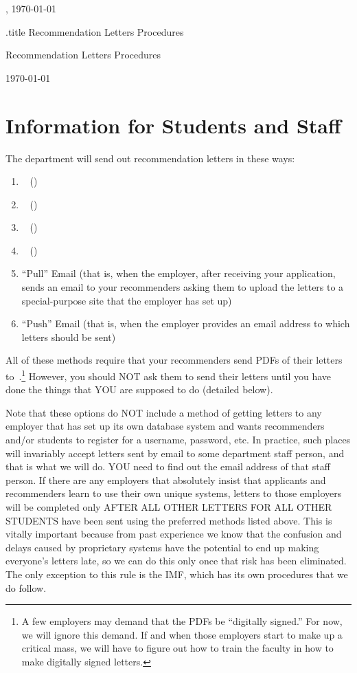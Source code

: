 \documentclass{econtex}
\begin{document}
\hfill{\tiny \jobname, \today}
\vspace{.1in}

\begin{verbatimwrite}{\jobname.title}
Recommendation Letters Procedures
\end{verbatimwrite}
\centerline{\Large Recommendation Letters Procedures}\medskip\medskip

\centerline{\today}\medskip\medskip

\ifdvi\large\fi

\section{Information for Students and Staff}

The department will send out recommendation letters in these ways:
\begin{enumerate}
\item \EJM ~ (\EJMLink)
\item \AJO ~ (\AJOLink)
\item \AEA ~ (\AEALink)
\item \Interfolio ~ (\InterfolioLink)
\item ``Pull'' Email (that is, when the employer, after receiving your application, sends an email to your recommenders asking them to upload the letters to a special-purpose site that the employer has set up)
\item ``Push'' Email (that is, when the employer provides an email address to which letters should be sent)
\end{enumerate}

All of these methods require that your recommenders send PDFs of their letters 
to~\JMStaffEmail.\footnote{A few employers may demand that the PDFs be ``digitally signed.''  For now, we will ignore this demand.  If and when those employers start to make up a critical mass, we will have to figure out how to train the faculty in how to make digitally signed letters.}  However, you should NOT ask them to send their letters until you have done the things that YOU are supposed to do (detailed below).

Note that these options do NOT include a method of getting letters to
any employer that has set up its own database system and wants
recommenders and/or students to register for a username, password,
etc.  In practice, such places will invariably accept letters sent by
email to some department staff person, and that is what we will do.
YOU need to find out the email address of that staff person.  If there
are any employers that absolutely insist that applicants and
recommenders learn to use their own unique systems, letters to those
employers will be completed only AFTER ALL OTHER LETTERS FOR ALL OTHER
STUDENTS have been sent using the preferred methods listed above.
This is vitally important because from past experience we know that
the confusion and delays caused by proprietary systems have the
potential to end up making everyone's letters late, so we can do this
only once that risk has been eliminated.  The only exception to this
rule is the IMF, which has its own procedures that we do follow.
\end{document}
